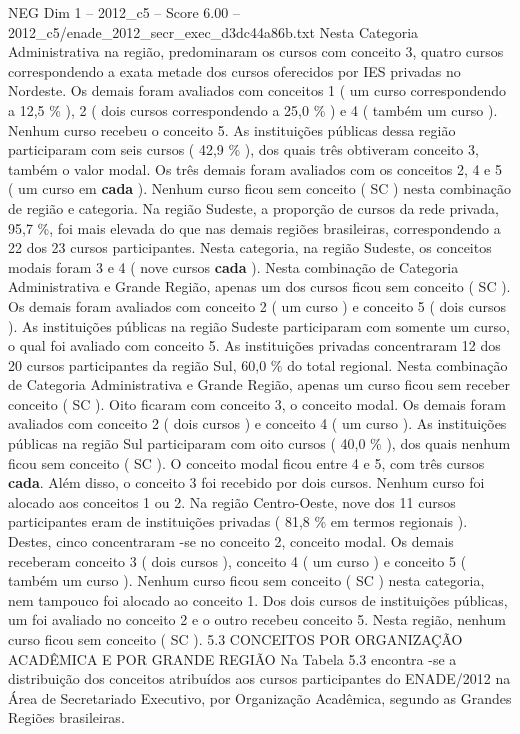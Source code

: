 \begin{textsample}{NEG Dim 1 – 2012\_c5 – Score 6.00 – 2012\_c5/enade\_2012\_secr\_exec\_d3dc44a86b.txt}
Nesta Categoria Administrativa na região, predominaram os cursos com conceito 3, quatro cursos correspondendo a exata metade dos cursos oferecidos por IES privadas no Nordeste.
Os demais foram avaliados com conceitos 1 ( um curso correspondendo a 12,5 \% ), 2 ( dois cursos correspondendo a 25,0 \% ) e 4 ( também um curso ).
Nenhum curso recebeu o conceito 5.
As instituições públicas dessa região participaram com seis cursos ( 42,9 \% ), dos quais três obtiveram conceito 3, também o valor modal.
Os três demais foram avaliados com os conceitos 2, 4 e 5 ( um curso em \textbf{cada} ).
Nenhum curso ficou sem conceito ( SC ) nesta combinação de região e categoria.
Na região Sudeste, a proporção de cursos da rede privada, 95,7 \%, foi mais elevada do que nas demais regiões brasileiras, correspondendo a 22 dos 23 cursos participantes.
Nesta categoria, na região Sudeste, os conceitos modais foram 3 e 4 ( nove cursos \textbf{cada} ).
Nesta combinação de Categoria Administrativa e Grande Região, apenas um dos cursos ficou sem conceito ( SC ).
Os demais foram avaliados com conceito 2 ( um curso ) e conceito 5 ( dois cursos ).
As instituições públicas na região Sudeste participaram com somente um curso, o qual foi avaliado com conceito 5.
As instituições privadas concentraram 12 dos 20 cursos participantes da região Sul, 60,0 \% do total regional.
Nesta combinação de Categoria Administrativa e Grande Região, apenas um curso ficou sem receber conceito ( SC ).
Oito ficaram com conceito 3, o conceito modal.
Os demais foram avaliados com conceito 2 ( dois cursos ) e conceito 4 ( um curso ).
As instituições públicas na região Sul participaram com oito cursos ( 40,0 \% ), dos quais nenhum ficou sem conceito ( SC ).
O conceito modal ficou entre 4 e 5, com três cursos \textbf{cada}.
Além disso, o conceito 3 foi recebido por dois cursos.
Nenhum curso foi alocado aos conceitos 1 ou 2.
Na região Centro-Oeste, nove dos 11 cursos participantes eram de instituições privadas ( 81,8 \% em termos regionais ).
Destes, cinco concentraram -se no conceito 2, conceito modal.
Os demais receberam conceito 3 ( dois cursos ), conceito 4 ( um curso ) e conceito 5 ( também um curso ).
Nenhum curso ficou sem conceito ( SC ) nesta categoria, nem tampouco foi alocado ao conceito 1.
Dos dois cursos de instituições públicas, um foi avaliado no conceito 2 e o outro recebeu conceito 5.
Nesta região, nenhum curso ficou sem conceito ( SC ). 5.3 CONCEITOS POR ORGANIZAÇÃO ACADÊMICA E POR GRANDE REGIÃO Na Tabela 5.3 encontra -se a distribuição dos conceitos atribuídos aos cursos participantes do ENADE/2012 na Área de Secretariado Executivo, por Organização Acadêmica, segundo as Grandes Regiões brasileiras.

\end{textsample}
